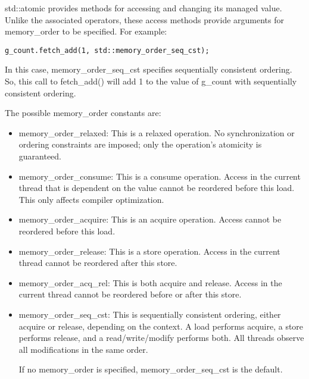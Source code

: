 std::atomic provides methods for accessing and changing its managed value. Unlike the associated operators, these access methods provide arguments for memory\_order to be specified. For example:

\begin{lstlisting}[style=styleCXX]
g_count.fetch_add(1, std::memory_order_seq_cst);
\end{lstlisting}

In this case, memory\_order\_seq\_cst specifies sequentially consistent ordering. So, this call to fetch\_add() will add 1 to the value of g\_count with sequentially consistent ordering.

The possible memory\_order constants are:

\begin{itemize}
\item 
memory\_order\_relaxed: This is a relaxed operation. No synchronization or ordering constraints are imposed; only the operation's atomicity is guaranteed.

\item 
memory\_order\_consume: This is a consume operation. Access in the current thread that is dependent on the value cannot be reordered before this load. This only affects compiler optimization.

\item 
memory\_order\_acquire: This is an acquire operation. Access cannot be reordered before this load.

\item 
memory\_order\_release: This is a store operation. Access in the current thread cannot be reordered after this store.

\item 
memory\_order\_acq\_rel: This is both acquire and release. Access in the current thread cannot be reordered before or after this store.

\item 
memory\_order\_seq\_cst: This is sequentially consistent ordering, either acquire or release, depending on the context. A load performs acquire, a store performs release, and a read/write/modify performs both. All threads observe all modifications in the same order.

If no memory\_order is specified, memory\_order\_seq\_cst is the default.
\end{itemize}





